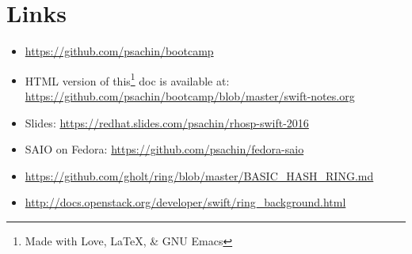 \documentclass{article}
\begin{document}
\section{Links}
\label{sec:org4cd01d9}
\begin{itemize}
\item \url{https://github.com/psachin/bootcamp}
\item HTML version of this\footnote[1]{Made with Love, \LaTeX, \& GNU Emacs} doc is available at: \newline
\url{https://github.com/psachin/bootcamp/blob/master/swift-notes.org}
\item Slides: \url{https://redhat.slides.com/psachin/rhosp-swift-2016}
\item SAIO on Fedora: \url{https://github.com/psachin/fedora-saio}
\item \url{https://github.com/gholt/ring/blob/master/BASIC\_HASH\_RING.md}
\item \url{http://docs.openstack.org/developer/swift/ring\_background.html}
\end{itemize}
\end{document}
